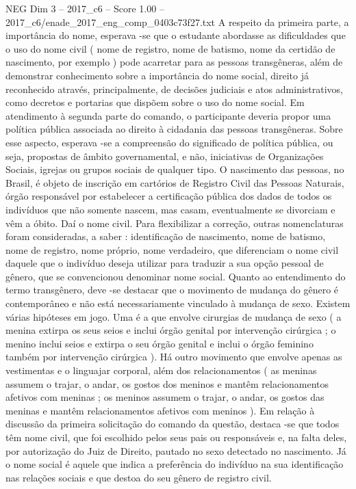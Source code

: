 \begin{textsample}{NEG Dim 3 – 2017\_c6 – Score 1.00 – 2017\_c6/enade\_2017\_eng\_comp\_0403c73f27.txt}
A respeito da primeira parte, a importância do nome, esperava -se que o estudante abordasse as dificuldades que o uso do nome civil ( nome de registro, nome de batismo, nome da certidão de nascimento, por exemplo ) pode acarretar para as pessoas transgêneras, além de demonstrar conhecimento sobre a importância do nome social, direito já reconhecido através, principalmente, de decisões judiciais e atos administrativos, como decretos e portarias que dispõem sobre o uso do nome social.
Em atendimento à segunda parte do comando, o participante deveria propor uma política pública associada ao direito à cidadania das pessoas transgêneras.
Sobre esse aspecto, esperava -se a compreensão do significado de política pública, ou seja, propostas de âmbito governamental, e não, iniciativas de Organizações Sociais, igrejas ou grupos sociais de qualquer tipo.
O nascimento das pessoas, no Brasil, é objeto de inscrição em cartórios de Registro Civil das Pessoas Naturais, órgão responsável por estabelecer a certificação pública dos dados de todos os indivíduos que não somente nascem, mas casam, eventualmente se divorciam e vêm a óbito.
Daí o nome civil.
Para flexibilizar a correção, outras nomenclaturas foram consideradas, a saber : identificação de nascimento, nome de batismo, nome de registro, nome próprio, nome verdadeiro, que diferenciam o nome civil daquele que o indivíduo deseja utilizar para traduzir a sua opção pessoal de gênero, que se convencionou denominar nome social.
Quanto ao entendimento do termo transgênero, deve -se destacar que o movimento de mudança do gênero é contemporâneo e não está necessariamente vinculado à mudança de sexo.
Existem várias hipóteses em jogo.
Uma é a que envolve cirurgias de mudança de sexo ( a menina extirpa os seus seios e inclui órgão genital por intervenção cirúrgica ; o menino inclui seios e extirpa o seu órgão genital e inclui o órgão feminino também por intervenção cirúrgica ).
Há outro movimento que envolve apenas as vestimentas e o linguajar corporal, além dos relacionamentos ( as meninas assumem o trajar, o andar, os gostos dos meninos e mantêm relacionamentos afetivos com meninas ; os meninos assumem o trajar, o andar, os gostos das meninas e mantêm relacionamentos afetivos com meninos ).
Em relação à discussão da primeira solicitação do comando da questão, destaca -se que todos têm nome civil, que foi escolhido pelos seus pais ou responsáveis e, na falta deles, por autorização do Juiz de Direito, pautado no sexo detectado no nascimento.
Já o nome social é aquele que indica a preferência do indivíduo na sua identificação nas relações sociais e que destoa do seu gênero de registro civil.

\end{textsample}
